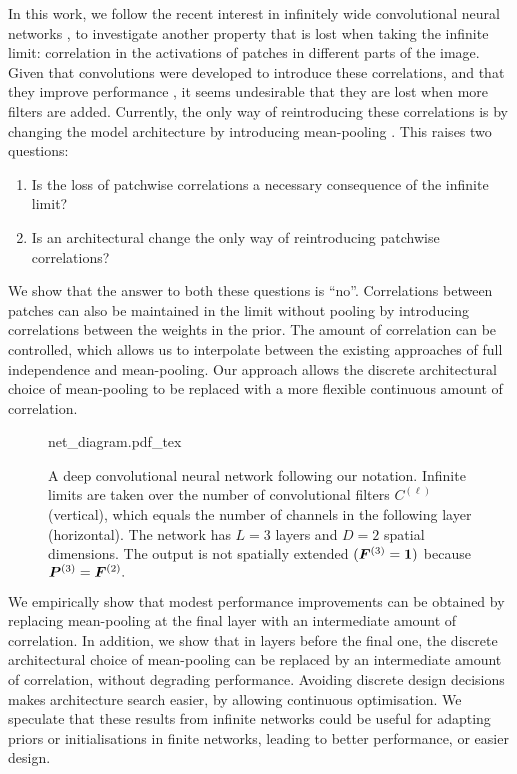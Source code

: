 \documentclass[accepted]{uai2021} %
\newcommand{\layerAs}[2]{Z^{(#1)}_{#2}(\vX)}
\newcommand{\layerC}[1]{C^{(#1)}}
\newcommand{\layersizebase}{\vF}
\newcommand{\layersize}[1]{{\layersizebase^{\bra{#1}}}}
\newcommand{\patchsizebase}{\vP}
\newcommand{\patchsize}[1]{{\patchsizebase^{\bra{#1}}}}
\newcommand{\0}{\boldsymbol{0}}
\newcommand{\1}{\boldsymbol{1}}
\begin{document}
In this work, we follow the recent interest in infinitely wide convolutional neural networks \citep{garriga2018infiniteconv,novak2019infiniteconv}, to investigate another property that is lost when taking the infinite limit: correlation in the activations of patches in different parts of the image.
Given that convolutions were developed to introduce these correlations, and that they improve performance \citep{arora2019exact}, it seems undesirable that they are lost when more filters are added.
Currently, the only way of reintroducing these correlations is by changing the model architecture by introducing mean-pooling \citep{novak2019infiniteconv}. This raises two questions:
\begin{enumerate}[label=\textbf{\arabic*)}]
\itemsep0em
\item Is the loss of patchwise correlations a necessary consequence of the infinite limit?
\item Is an architectural change the only way of reintroducing patchwise correlations?
\end{enumerate}

We show that the answer to both these questions is ``no''. Correlations between patches can also be
maintained in the limit without pooling by introducing correlations between the weights in the prior. The amount of correlation can be controlled,
which allows us to interpolate between the existing approaches of full
independence and mean-pooling. Our approach allows the discrete architectural choice of mean-pooling to be replaced with a more flexible continuous amount of correlation.

\begin{figure*}[t]
  \centering
{%
  {net_diagram.pdf_tex}}
  \caption{A deep convolutional neural network following our notation. Infinite limits are taken over the number of convolutional filters $\layerC{\ell}$ (vertical), which equals the number of channels in the following layer (horizontal). The network has $L=3$ layers and $D=2$ spatial dimensions. The output is not spatially extended $(\layersize{3}=\1)$ because $\patchsize{3} = \layersize{2}.$}
  \label{fig:fancy-cnn}
\end{figure*}


We empirically show that modest performance improvements can be obtained by replacing mean-pooling at the final layer with an intermediate amount of correlation. In addition, we show that in layers before the final one, the discrete architectural choice of mean-pooling can be replaced by an intermediate amount of correlation, without degrading performance. Avoiding discrete design decisions makes architecture search easier, by allowing continuous optimisation.
We speculate that these results from infinite networks could be useful for adapting priors or initialisations in finite networks, leading to better performance, or easier design.
\end{document}
